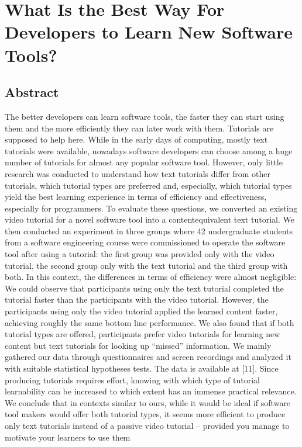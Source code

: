 \section{What Is the Best Way For Developers to Learn New Software Tools?}

\subsection{Abstract}

The better developers can learn software tools, the faster they can start using them and the more
efficiently they can later work with them. Tutorials are supposed to help here. While in the early days of
computing, mostly text tutorials were available, nowadays software developers can choose among a huge
number of tutorials for almost any popular software tool. However, only little research was conducted to
understand how text tutorials differ from other tutorials, which tutorial types are preferred and, especially,
which tutorial types yield the best learning experience in terms of efficiency and effectiveness, especially for
programmers.
To evaluate these questions, we converted an existing video tutorial for a novel software tool into a contentequivalent text tutorial. We then conducted an experiment in three groups where 42 undergraduate students
from a software engineering course were commissioned to operate the software tool after using a tutorial:
the first group was provided only with the video tutorial, the second group only with the text tutorial and the
third group with both.
In this context, the differences in terms of efficiency were almost negligible: We could observe that participants using only the text tutorial completed the tutorial faster than the participants with the video tutorial.
However, the participants using only the video tutorial applied the learned content faster, achieving roughly
the same bottom line performance. We also found that if both tutorial types are offered, participants prefer
video tutorials for learning new content but text tutorials for looking up “missed” information.
We mainly gathered our data through questionnaires and screen recordings and analyzed it with suitable
statistical hypotheses tests. The data is available at [11].
Since producing tutorials requires effort, knowing with which type of tutorial learnability can be increased
to which extent has an immense practical relevance. We conclude that in contexts similar to ours, while it
would be ideal if software tool makers would offer both tutorial types, it seems more efficient to produce
only text tutorials instead of a passive video tutorial – provided you manage to motivate your learners to use
them

